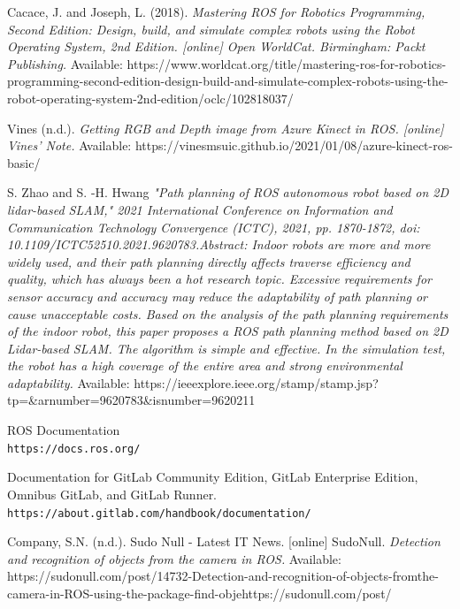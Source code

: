 \documentclass[twoside,12pt,times,onecolumn,a4paper]{report}
\begin{document}
\begin{thebibliography}{9}
Cacace, J. and Joseph, L. (2018). 
\textit{Mastering ROS for Robotics Programming, 
Second Edition: Design, build, and simulate complex robots using the Robot 
Operating System, 2nd Edition. [online] Open WorldCat. Birmingham: Packt 
Publishing. }
Available:  https://www.worldcat.org/title/mastering-ros-for-robotics-programming-second-edition-design-build-and-simulate-complex-robots-using-the-robot-operating-system-2nd-edition/oclc/102818037/

Vines (n.d.). 
\textit{Getting RGB and Depth image from Azure Kinect in ROS. [online] 
Vines’ Note.}
Available: https://vinesmsuic.github.io/2021/01/08/azure-kinect-ros-basic/


S. Zhao and S. -H. Hwang
\textit{"Path planning of ROS autonomous robot based on 2D lidar-based SLAM," 2021 International Conference on Information and Communication Technology Convergence (ICTC), 2021, pp. 1870-1872, doi: 10.1109/ICTC52510.2021.9620783.Abstract: Indoor robots are more and more widely used, and their path planning directly affects traverse efficiency and quality, which has always been a hot research topic. Excessive requirements for sensor accuracy and accuracy may reduce the adaptability of path planning or cause unacceptable costs. Based on the analysis of the path planning requirements of the indoor robot, this paper proposes a ROS path planning method based on 2D Lidar-based SLAM. The algorithm is simple and effective. In the simulation test, the robot has a high coverage of the entire area and strong environmental adaptability. }
Available: https://ieeexplore.ieee.org/stamp/stamp.jsp?tp=\&arnumber=9620783\&isnumber=9620211


ROS Documentation
\\\texttt{https://docs.ros.org/}

 Documentation for GitLab Community Edition, GitLab Enterprise Edition, Omnibus GitLab, and GitLab Runner.
\\\texttt{https://about.gitlab.com/handbook/documentation/}

Company, S.N. (n.d.). Sudo Null - Latest IT News. [online] SudoNull. 
\textit{Detection and recognition of objects from the camera in ROS.}
Available: https://sudonull.com/post/14732-Detection-and-recognition-of-objects-fromthe-camera-in-ROS-using-the-package-find-objehttps://sudonull.com/post/


\end{thebibliography}
\end{document}
